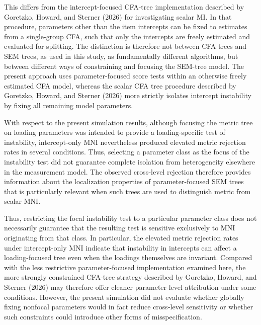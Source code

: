 \documentclass[
  man,
  floatsintext]{apa7}
\begin{document}
This differs from the intercept-focused CFA-tree implementation
described by Goretzko, Howard, and Sterner (2026) for investigating
scalar MI. In that procedure, parameters other than the item intercepts
can be fixed to estimates from a single-group CFA, such that only the
intercepts are freely estimated and evaluated for splitting. The
distinction is therefore not between CFA trees and SEM trees, as used in
this study, as fundamentally different algorithms, but between different
ways of constraining and focusing the SEM-tree model. The present
approach uses parameter-focused score tests within an otherwise freely
estimated CFA model, whereas the scalar CFA tree procedure described by
Goretzko, Howard, and Sterner (2026) more strictly isolates intercept
instability by fixing all remaining model parameters.

With respect to the present simulation results, although focusing the
metric tree on loading parameters was intended to provide a
loading-specific test of instability, intercept-only MNI nevertheless
produced elevated metric rejection rates in several conditions. Thus,
selecting a parameter class as the focus of the instability test did not
guarantee complete isolation from heterogeneity elsewhere in the
measurement model. The observed cross-level rejection therefore provides
information about the localization properties of parameter-focused SEM
trees that is particularly relevant when such trees are used to
distinguish metric from scalar MNI.

Thus, restricting the focal instability test to a particular parameter
class does not necessarily guarantee that the resulting test is
sensitive exclusively to MNI originating from that class. In particular,
the elevated metric rejection rates under intercept-only MNI indicate
that instability in intercepts can affect a loading-focused tree even
when the loadings themselves are invariant. Compared with the less
restrictive parameter-focused implementation examined here, the more
strongly constrained CFA-tree strategy described by Goretzko, Howard,
and Sterner (2026) may therefore offer cleaner parameter-level
attribution under some conditions. However, the present simulation did
not evaluate whether globally fixing nonfocal parameters would in fact
reduce cross-level sensitivity or whether such constraints could
introduce other forms of misspecification.
\end{document}
